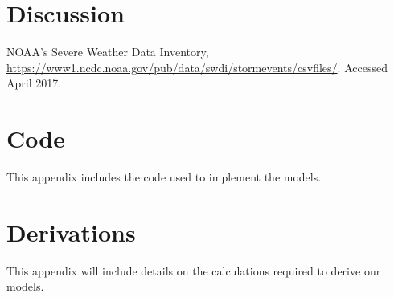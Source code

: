 \documentclass{article}
\begin{document}
\section{Discussion}
\label{s:discussion}

\begin{thebibliography}{1}
   NOAA's Severe Weather Data Inventory, 
    \url{https://www1.ncdc.noaa.gov/pub/data/swdi/stormevents/csvfiles/}. 
    Accessed April 2017.
\end{thebibliography}
\clearpage
\appendix
\section{Code}
\label{a:code}
This appendix includes the code used to implement the models.

\section{Derivations}
\label{a:derivation}
This appendix will include details on the calculations required to derive our models.
\end{document}
